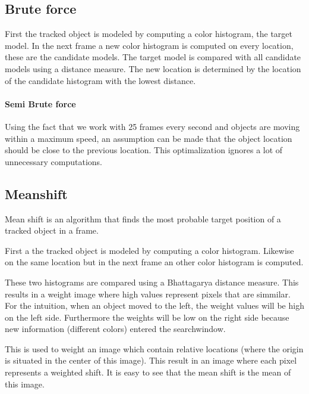 \documentclass[a4paper,11pt]{article}
\begin{document}
	\subsection{Brute force}
		First the tracked object is modeled by computing a color histogram, the
		target model.
		In the next frame a new color histogram is computed on every location,
		these are the candidate models.
		The target model is compared with all candidate models using a distance
		measure. The new location is determined by the location of the candidate
		histogram with the lowest distance.
		
		\paragraph{Semi Brute force}
		Using the fact that we work with 25 frames every second and objects are moving
		within a maximum speed, an assumption can be made that the object
		location should be close to the previous location. This optimalization
		ignores a lot of unnecessary computations.

	
	\subsection{Meanshift}
		Mean shift is an algorithm that finds the most probable target position of a
		tracked object in a frame.

		First a the tracked object is modeled by computing a color histogram.
		Likewise on the same location but in the next frame an other color histogram is
		computed.

		These two histograms are compared using a Bhattagarya distance measure. This
		results in a weight image where high values represent pixels that are
		simmilar.  For the intuition, when an object moved to the left, the weight
		values will be high on the left side. Furthermore the weights will be low on
		the right side because new information (different colors) entered the
		searchwindow. 

		This is used to weight an image which contain relative locations
		(where the origin is situated in the center of this image). This result in
		an image where each pixel represents a weighted shift. It is easy to see
		that the mean shift is the mean of this image.
	

\end{document}
